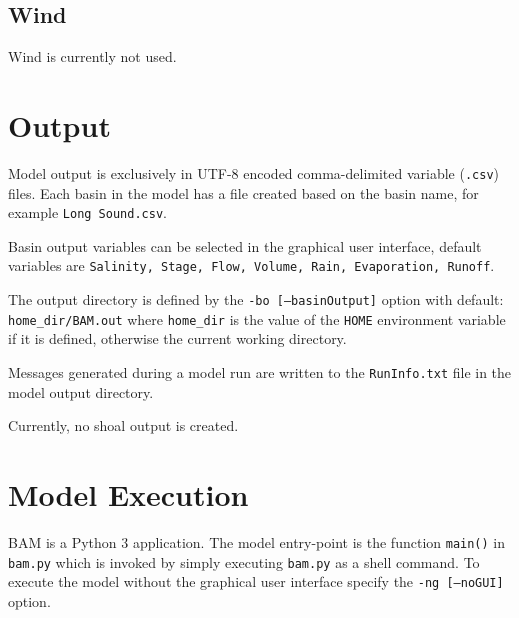 \subsection{Wind}
\label{sec:Wind}
Wind is currently not used. 

\clearpage 
\section{Output}
\label{sec:Output}
Model output is exclusively in UTF-8 encoded comma-delimited variable (\texttt{.csv}) files.  Each basin in the model has a file created based on the basin name, for example \texttt{Long Sound.csv}. 

Basin output variables can be selected in the graphical user interface, default variables are \texttt{Salinity, Stage, Flow, Volume, Rain, Evaporation, Runoff}.

The output directory is defined by the \texttt{-bo [--basinOutput]} option with default: \newline \texttt{home\_dir/BAM.out} where \texttt{home\_dir} is the value of the \texttt{HOME} environment variable if it is defined, otherwise the current working directory.

Messages generated during a model run are written to the \texttt{RunInfo.txt} file in the model output directory. 

Currently, no shoal output is created. 

\clearpage 
\section{Model Execution}
\label{sec:Model Execution}
BAM is a Python 3 application.  The model entry-point is the function \texttt{main()} in \texttt{bam.py} which is invoked by simply executing \texttt{bam.py} as a shell command.  To execute the model without the graphical user interface specify the \texttt{-ng [--noGUI]} option. 

